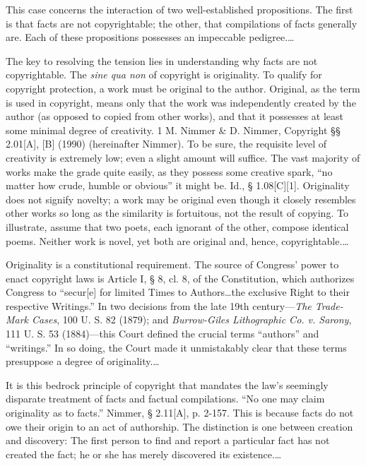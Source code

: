 
This case concerns the interaction of two well-established propositions. The
first is that facts are not copyrightable; the other, that compilations of
facts generally are. Each of these propositions possesses an impeccable
pedigree.\dots

The key to resolving the tension lies in understanding why facts are not
copyrightable. The \textit{sine qua non} of copyright is originality. To
qualify for copyright protection, a work must be original to the author.
Original, as the term is used in copyright, means only that the work was
independently created by the author (as opposed to copied from other works),
and that it possesses at least some minimal degree of creativity. 1 M. Nimmer
\& D. Nimmer, Copyright {\S}{\S} 2.01[A], [B] (1990) (hereinafter Nimmer). To
be sure, the requisite level of creativity is extremely low; even a slight
amount will suffice. The vast majority of works make the grade quite easily, as
they possess some creative spark, ``no matter how crude, humble or obvious'' it
might be. Id., {\S} 1.08[C][1]. Originality does not signify novelty; a work
may be original even though it closely resembles other works so long as the
similarity is fortuitous, not the result of copying. To illustrate, assume that
two poets, each ignorant of the other, compose identical poems. Neither work is
novel, yet both are original and, hence, copyrightable.\dots

Originality is a constitutional requirement. The source of Congress' power to
enact copyright laws is Article I, {\S} 8, cl. 8, of the Constitution, which
authorizes Congress to ``secur[e] for limited Times to Authors\ldots the
exclusive Right to their respective Writings.'' In two decisions from the late
19th century---\textit{The Trade-Mark Cases}, 100 U. S. 82 (1879); and
\textit{Burrow-Giles Lithographic Co. v. Sarony}, 111 U. S. 53 (1884)---this
Court defined the crucial terms ``authors'' and ``writings.'' In so doing, the
Court made it unmistakably clear that these terms presuppose a degree of
originality.\dots

It is this bedrock principle of copyright that mandates the law's seemingly
disparate treatment of facts and factual compilations. ``No one may claim
originality as to facts.'' Nimmer, {\S} 2.11[A], p. 2-157. This is because
facts do not owe their origin to an act of authorship. The distinction is one
between creation and discovery: The first person to find and report a
particular fact has not created the fact; he or she has merely discovered its
existence.\ldots

